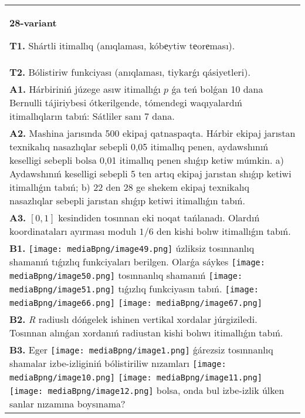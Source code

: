 \documentclass{article}
\begin{document}
\begin{tabular}{m{17cm}}
\end{tabular}
\vspace{1cm}


\begin{tabular}{m{17cm}}
\textbf{28-variant}
\newline

\textbf{T1.} Shártli itimallıq (anıqlaması, kóbеytiw tеorеması).
 \\
\textbf{T2.} Bólistiriw funkciyası (anıqlaması, tiykarǵı qásiyetleri).
 \\
\textbf{A1.} 
Hárbiriniń júzege asıw itimallıǵı $p$ ǵa teń bolǵan 10 dana Bernulli tájiriybesi ótkerilgende, tómendegi waqıyalardıń itimallıqların tabıń: Sátliler sanı 7 dana.
 \\
\textbf{A2.} Mashina jarısında 500 ekipaj qatnaspaqta. Hárbir ekipaj jarıstan texnikalıq nasazlıqlar sebepli 0,05 itimallıq penen, aydawshınıń keselligi sebepli bolsa 0,01 itimallıq penen shıǵıp ketiw múmkin. a) Aydawshınıń keselligi sebepli 5 ten artıq ekipaj jarıstan shıǵıp ketiwi itimallıǵın tabıń; b) 22 den 28 ge shekem ekipaj texnikalıq nasazlıqlar sebepli jarıstan shıǵıp ketiwi itimallıǵın tabıń.
 \\
\textbf{A3.} $\left[ 0,1 \right]$ kesindiden tosınnan eki noqat tańlanadı. Olardıń koordinataları ayırması modulı $1/6$ den kishi bolıw itimallıǵın tabıń.
 \\
\textbf{B1.} \texttt{[image: mediaBpng/image49.png]} úzliksiz tosınnanlıq shamanıń tıǵızlıq funkciyaları berilgen. Olarǵa sáykes \texttt{[image: mediaBpng/image50.png]} tosınnanlıq shamanıń \texttt{[image: mediaBpng/image51.png]} tıǵızlıq funkciyasın tabıń. \texttt{[image: mediaBpng/image66.png]} \texttt{[image: mediaBpng/image67.png]}
 \\
\textbf{B2.} \emph{R} radiuslı dóńgelek ishinen vertikal xordalar júrgiziledi. Tosınnan alınǵan xordanıń radiustan kishi bolıwı itimallıǵın tabıń.
 \\
\textbf{B3.} Eger \texttt{[image: mediaBpng/image1.png]} ǵárezsiz tosınnanlıq shamalar izbe-izliginiń bólistiriliw nızamları
\texttt{[image: mediaBpng/image10.png]} \texttt{[image: mediaBpng/image11.png]} \texttt{[image: mediaBpng/image12.png]}
bolsa, onda bul izbe-izlik úlken sanlar nızamına boysınama?
 \\

\end{tabular}
\end{document}

